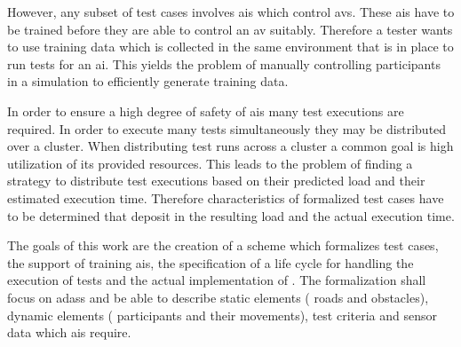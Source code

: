 However, any subset of test cases involves \glspl{ai} which control \glspl{av}.
These \glspl{ai} have to be trained before they are able to control an \gls{av} suitably.
Therefore a tester wants to use training data which is collected in the same environment that is in place to run tests for an \gls{ai}.
This yields the problem of manually controlling participants in a simulation to efficiently generate training data.\par

In order to ensure a high degree of safety of \glspl{ai} many test executions are required.
In order to execute many tests simultaneously they may be distributed over a cluster.
When distributing test runs across a cluster a common goal is high utilization of its provided resources.
This leads to the problem of finding a strategy to distribute test executions based on their predicted load and their estimated execution time.
Therefore characteristics of formalized test cases have to be determined that deposit in the resulting load and the actual execution time.\par

The goals of this work are the creation of a scheme which formalizes test cases, the support of training \glspl{ai}, the specification of a life cycle for handling the execution of tests and the actual implementation of \drivebuild{}.
The formalization shall focus on \glspl{adas} and be able to describe static elements (\eg{} roads and obstacles), dynamic elements (\eg{} participants and their movements), test criteria and sensor data which \glspl{ai} require.
